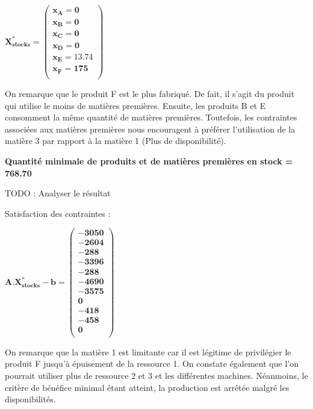 \documentclass[12pt]{article}
\begin{document}
\begin{center}
$\mathbf{X^{*}_{stocks} = 
   \left (
   \begin{array}{c}
      x_{A} = 0 \\
      x_{B} = 0 \\
      x_{C} = 0 \\
      x_{D} = 0 \\
      x_{E} = 13.74 \\
      x_{F} = 175 \\
   \end{array}
   \right )
 } $ 
\end{center}

On remarque que le produit F est le plus fabriqué. De fait, il s'agit du produit qui utilise le moins de matières premières. Ensuite, les produits B et E consomment la même quantité de matières premières. Toutefois, les contraintes associées aux matières premières nous encouragent à préférer l'utilisation de la matière 3 par rapport à la matière 1 (Plus de disponibilité).
\\
\begin{center}
\textbf{Quantité minimale de produits et de matières premières en stock = 768.70}
\end{center}

TODO : Analyser le résultat

Satisfaction des contraintes : 
\begin{center}
$\mathbf{A.X^{*}_{stocks} - b = 
   \left (
   \begin{array}{c}
      -3050 \\
      -2604 \\
      -288 \\
      -3396\\
      -288 \\
      -4690 \\
      -3575 \\
      0\\
      -418 \\
      -458\\
      0\\
   \end{array}
   \right )
 } $ 
\end{center}

On remarque que la matière 1 est limitante car il est légitime de privilégier le produit F jusqu'à épuisement de la ressource 1.
On constate également que l'on pourrait utiliser plus de ressource 2 et 3 et les différentes machines. Néanmoins, le critère de bénéfice minimal étant atteint, la production est arrêtée malgré les disponibilités.
\end{document}
